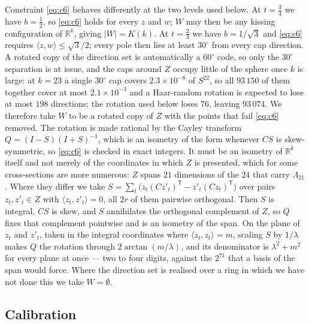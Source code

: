 \documentclass[11pt]{amsart}
\theoremstyle{remark}
\newcommand{\ip}[2]{\langle #1,#2\rangle}
\newcommand{\R}{\mathbb{R}}
\begin{document}
Constraint \eqref{eq:c6} behaves differently at the two levels used below. At
$t=\tfrac34$ we have $b=\tfrac12$, so \eqref{eq:c6} holds for every $z$ and $w$;
$W$ may then be any kissing configuration of $\R^k$, giving $|W|=K(k)$. At
$t=\tfrac23$ we have $b=1/\sqrt3$ and \eqref{eq:c6} requires
$\ip{z}{w}\le\sqrt3/2$; every pole then lies at least $30^\circ$ from every cap
direction. A rotated copy of the direction set is automatically a $60^\circ$
code, so only the $30^\circ$ separation is at issue, and the caps around $Z$ occupy
little of the sphere once $k$ is large: at $k=23$ a single $30^\circ$ cap covers
$2.3\times10^{-8}$ of $S^{22}$, so all $93\,150$ of them together cover at most
$2.1\times10^{-3}$ and a Haar-random rotation is expected to lose at most $198$
directions; the rotation used below loses $76$, leaving $93\,074$. We
therefore take $W$ to be a rotated copy of $Z$ with the points that fail
\eqref{eq:c6} removed. The rotation is made rational by the Cayley transform
$Q=(I-S)(I+S)^{-1}$, which is an isometry of the form whenever $CS$ is
skew-symmetric, so \eqref{eq:c6} is checked in exact integers. It must be an
isometry of $\R^k$ itself and not merely of the coordinates in which $Z$ is
presented, which for some cross-sections are more numerous: $Z$ spans $21$
dimensions of the $24$ that carry $\Lambda_{21}$. Where they differ we take
$S=\sum_t\bigl(z_t(Cz'_t)^{\mathsf T}-z'_t(Cz_t)^{\mathsf T}\bigr)$ over pairs
$z_t,z'_t\in Z$ with $\ip{z_t}{z'_t}=0$, all $2r$ of them pairwise orthogonal.
Then $S$ is integral, $CS$ is skew, and $S$ annihilates the orthogonal complement
of $Z$, so $Q$ fixes that complement pointwise and is an isometry of the span. On
the plane of $z_t$ and $z'_t$, taken in the integral coordinates where
$\ip{z_t}{z_t}=m$, scaling $S$ by $1/\lambda$ makes $Q$ the rotation through
$2\arctan(m/\lambda)$, and its denominator is $\lambda^2+m^2$ for every plane at
once --- two to four digits, against the $2^{71}$ that a basis of the span
would force. Where the direction set is
realised over a ring in which we have not done this we take $W=\emptyset$.

\subsection{Calibration}\label{ss:calib}
\end{document}
